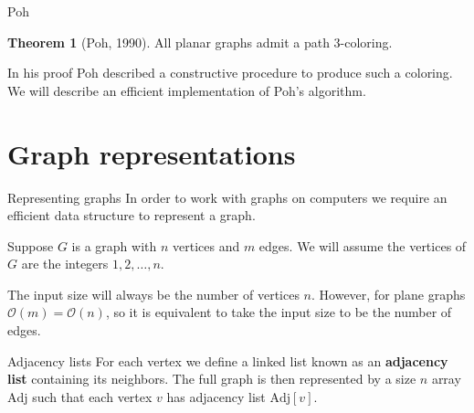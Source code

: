 \documentclass[pdf]{beamer}
\theoremstyle{definition}
\newtheorem{thm}{Theorem}
\theoremstyle{definition}
\theoremstyle{definition}
\theoremstyle{definition}
\theoremstyle{definition}
\theoremstyle{definition}
\theoremstyle{definition}
\theoremstyle{definition}
\theoremstyle{definition}
\theoremstyle{definition}
\theoremstyle{definition}
\theoremstyle{definition}
\begin{document}
\begin{frame}{Poh}
\begin{thm}[Poh, 1990]
All planar graphs admit a path $3$-coloring.
\end{thm}

In his proof Poh described a constructive procedure to produce such a coloring.
We will describe an efficient implementation of Poh's algorithm.
\end{frame}

\section{Graph representations}

\begin{frame}{Representing graphs}
In order to work with graphs on computers we require an efficient data
structure to represent a graph.

Suppose $G$ is a graph with $n$ vertices and $m$ edges. We will assume the
vertices of $G$ are the integers $1,2,\ldots,n$.

The input size will always be the number of vertices $n$. However, for plane
graphs $\mathcal{O}(m)=\mathcal{O}(n)$, so it is equivalent to take the input
size to be the number of edges.
\end{frame}

\begin{frame}{Adjacency lists}
For each vertex we define a linked list known as an \textbf{adjacency list}
containing its neighbors. The full graph is then represented by a size $n$ array
$\text{Adj}$ such that each vertex $v$ has adjacency list $\text{Adj}[v]$.\\

\begin{center}
\end{center}
\end{frame}
\end{document}
